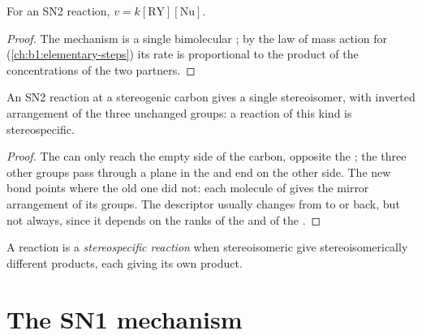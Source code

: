 \begin{proposition}\label{prop:b1:nucleophilic-substitution:sn2-law}
For an SN2 reaction, $v = k[\mathrm{RY}][\mathrm{Nu}]$.
\end{proposition}

\begin{proof}
The mechanism is a single bimolecular ; by the law of mass
action for  (\cref{ch:b1:elementary-steps}) its rate is
proportional to the product of the concentrations of the two partners.
\end{proof}

\begin{proposition}[Stereochemistry of SN2]\label{prop:b1:nucleophilic-substitution:sn2-inversion}
An SN2 reaction at a stereogenic carbon gives a single stereoisomer, with
inverted arrangement of the three unchanged groups: a reaction of this
kind is stereospecific.
\end{proposition}

\begin{proof}
The  can only reach the empty side of the carbon, opposite the
; the three other groups pass through a plane in the
 and end on the other side. The new bond points where
the old one did not: each molecule of  gives the mirror
arrangement of its groups. The descriptor usually changes from 
to  or back, but not always, since it depends on the ranks of the
 and of the .
\end{proof}

\begin{definition}\label{def:b1:nucleophilic-substitution:stereospecific}
A reaction is a \emph{stereospecific reaction}
when stereoisomeric  give stereoisomerically
different products, each  giving its own product.
\end{definition}

\section{The SN1 mechanism}

